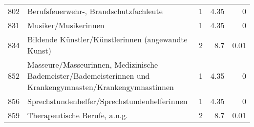 \begin{longtable}{lXrrr}
     802 &
     \multicolumn{1}{X}{ Berufsfeuerwehr-, Brandschutzfachleute   } &


       \num{1} &
       \num[round-mode=places,round-precision=2]{4.35} &
         \num[round-mode=places,round-precision=2]{0} \\

     831 &
     \multicolumn{1}{X}{ Musiker/Musikerinnen   } &


       \num{1} &
       \num[round-mode=places,round-precision=2]{4.35} &
         \num[round-mode=places,round-precision=2]{0} \\

     834 &
     \multicolumn{1}{X}{ Bildende Künstler/Künstlerinnen (angewandte Kunst)   } &


       \num{2} &
       \num[round-mode=places,round-precision=2]{8.7} &
         \num[round-mode=places,round-precision=2]{0.01} \\

     852 &
     \multicolumn{1}{X}{ Masseure/Masseurinnen, Medizinische Bademeister/Bademeisterinnen und Krankengymnasten/Krankengymnastinnen   } &


       \num{1} &
       \num[round-mode=places,round-precision=2]{4.35} &
         \num[round-mode=places,round-precision=2]{0} \\

     856 &
     \multicolumn{1}{X}{ Sprechstundenhelfer/Sprechstundenhelferinnen   } &


       \num{1} &
       \num[round-mode=places,round-precision=2]{4.35} &
         \num[round-mode=places,round-precision=2]{0} \\

     859 &
     \multicolumn{1}{X}{ Therapeutische Berufe, a.n.g.   } &


       \num{2} &
       \num[round-mode=places,round-precision=2]{8.7} &
         \num[round-mode=places,round-precision=2]{0.01} \\


\end{longtable}
